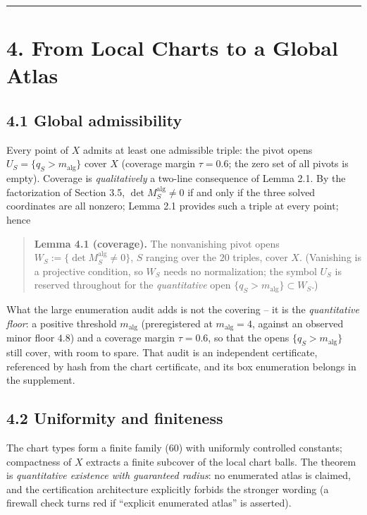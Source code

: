 \begin{center}\rule{\linewidth}{0.5pt}\end{center}

\section{4. From Local Charts to a Global Atlas}\label{from-local-charts-to-a-global-atlas}

\subsection{4.1 Global admissibility}\label{global-admissibility}

Every point of \(X\) admits at least one admissible triple: the pivot opens \(U_S = \{q_S > m_{\mathrm{alg}}\}\) cover \(X\) (coverage margin \(\tau = 0.6\); the zero set of all pivots is empty). Coverage is \emph{qualitatively} a two-line consequence of Lemma 2.1. By the factorization of Section 3.5, \(\det M_S^{\mathrm{alg}} \neq 0\) if and only if the three solved coordinates are all nonzero; Lemma 2.1 provides such a triple at every point; hence

\begin{quote}
\textbf{Lemma 4.1 (coverage).} The nonvanishing pivot opens \(W_S := \{\det M_S^{\mathrm{alg}} \neq 0\}\), \(S\) ranging over the \(20\) triples, cover \(X\). (Vanishing is a projective condition, so \(W_S\) needs no normalization; the symbol \(U_S\) is reserved throughout for the \emph{quantitative} open \(\{q_S > m_{\mathrm{alg}}\} \subset W_S\).)
\end{quote}

What the large enumeration audit adds is not the covering -- it is the \emph{quantitative floor}: a positive threshold \(m_{\mathrm{alg}}\) (preregistered at \(m_{\mathrm{alg}} = 4\), against an observed minor floor \(4.8\)) and a coverage margin \(\tau = 0.6\), so that the opens \(\{q_S > m_{\mathrm{alg}}\}\) still cover, with room to spare. That audit is an independent certificate, referenced by hash from the chart certificate, and its box enumeration belongs in the supplement.

\subsection{4.2 Uniformity and finiteness}\label{uniformity-and-finiteness}

The chart types form a finite family (60) with uniformly controlled constants; compactness of \(X\) extracts a finite subcover of the local chart balls. The theorem is \emph{quantitative existence with guaranteed radius}: no enumerated atlas is claimed, and the certification architecture explicitly forbids the stronger wording (a firewall check turns red if ``explicit enumerated atlas'' is asserted).

